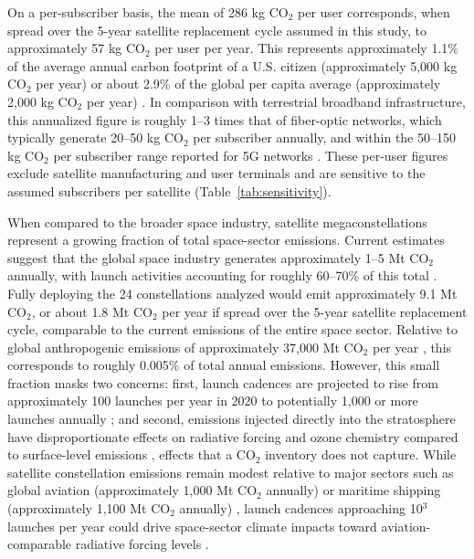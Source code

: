 \documentclass[pdflatex,sn-mathphys-num]{sn-jnl}
\theoremstyle{thmstyleone}%
\theoremstyle{thmstyletwo}%
\theoremstyle{thmstylethree}%
\begin{document}
On a per-subscriber basis, the mean of 286 kg CO$_2$ per user corresponds, when spread over the 5-year satellite replacement cycle assumed in this study, to approximately 57 kg CO$_2$ per user per year. This represents approximately 1.1\% of the average annual carbon footprint of a U.S. citizen (approximately 5,000 kg CO$_2$ per year) \citep{ritchie_co2_nodate} or about 2.9\% of the global per capita average (approximately 2,000 kg CO$_2$ per year) \citep{friedlingstein_global_nodate}. In comparison with terrestrial broadband infrastructure, this annualized figure is roughly 1--3 times that of fiber-optic networks, which typically generate 20--50 kg CO$_2$ per subscriber annually, and within the 50--150 kg CO$_2$ per subscriber range reported for 5G networks \citep{malmodin_energy_2018}. These per-user figures exclude satellite manufacturing and user terminals and are sensitive to the assumed subscribers per satellite (Table~\ref{tab:sensitivity}).

When compared to the broader space industry, satellite megaconstellations represent a growing fraction of total space-sector emissions. Current estimates suggest that the global space industry generates approximately 1--5 Mt CO$_2$ annually, with launch activities accounting for roughly 60--70\% of this total \citep{barker_global_2024}. Fully deploying the 24 constellations analyzed would emit approximately 9.1 Mt CO$_2$, or about 1.8 Mt CO$_2$ per year if spread over the 5-year satellite replacement cycle, comparable to the current emissions of the entire space sector. Relative to global anthropogenic emissions of approximately 37,000 Mt CO$_2$ per year \citep{friedlingstein_global_nodate}, this corresponds to roughly 0.005\% of total annual emissions. However, this small fraction masks two concerns: first, launch cadences are projected to rise from approximately 100 launches per year in 2020 to potentially 1,000 or more launches annually \citep{boley_satellite_2021}; and second, emissions injected directly into the stratosphere have disproportionate effects on radiative forcing and ozone chemistry compared to surface-level emissions \citep{ryan_impact_nodate, tsigaridis_composition_nodate}, effects that a CO$_2$ inventory does not capture. While satellite constellation emissions remain modest relative to major sectors such as global aviation (approximately 1,000 Mt CO$_2$ annually) \citep{lee_contribution_2021} or maritime shipping (approximately 1,100 Mt CO$_2$ annually) \citep{imo_fourth_nodate}, launch cadences approaching 10$^3$ launches per year could drive space-sector climate impacts toward aviation-comparable radiative forcing levels \citep{boley_satellite_2021}.
\end{document}
